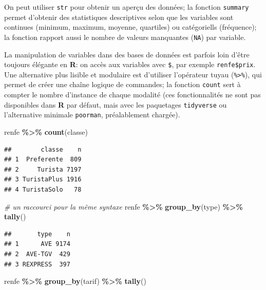 \documentclass[
  11pt,
  letterpaper,
]{book}
\newenvironment{Shaded}{\begin{snugshade}}{\end{snugshade}}
\newcommand{\CommentTok}[1]{\textcolor[rgb]{0.56,0.35,0.01}{\textit{#1}}}
\newcommand{\KeywordTok}[1]{\textcolor[rgb]{0.13,0.29,0.53}{\textbf{#1}}}
\newcommand{\NormalTok}[1]{#1}
\newcommand{\OperatorTok}[1]{\textcolor[rgb]{0.81,0.36,0.00}{\textbf{#1}}}
\newcommand{\StringTok}[1]{\textcolor[rgb]{0.31,0.60,0.02}{#1}}
\theoremstyle{definition}
\theoremstyle{definition}
\theoremstyle{definition}
\theoremstyle{remark}
\begin{document}
On peut utiliser \texttt{str} pour obtenir un aperçu des données; la fonction \texttt{summary} permet d'obtenir des statistiques descriptives selon que les variables sont continues (minimum, maximum, moyenne, quartiles) ou catégoriells (fréquence); la fonction rapport aussi le nombre de valeurs manquantes (\texttt{NA}) par variable.

La manipulation de variables dans des bases de données est parfois loin d'être toujours élégante en \textbf{R}: on accès aux variables avec \texttt{\$}, par exemple \texttt{renfe\$prix}. Une alternative plus lisible et modulaire est d'utiliser l'opérateur tuyau (\texttt{\%\textgreater{}\%}), qui permet de créer une chaîne logique de commandes; la fonction \texttt{count} sert à compter le nombre d'instance de chaque modalité (ces fonctionnalités ne sont pas disponibles dans \textbf{R} par défaut, mais avec les paquetages \texttt{tidyverse} ou l'alternative minimale \texttt{poorman}, préalablement chargée).

\begin{Shaded}
\begin{Highlighting}[]
\NormalTok{renfe }\OperatorTok{\%\textgreater{}\%}\StringTok{ }\KeywordTok{count}\NormalTok{(classe)}
\end{Highlighting}
\end{Shaded}

\begin{verbatim}
##        classe    n
## 1  Preferente  809
## 2     Turista 7197
## 3 TuristaPlus 1916
## 4 TuristaSolo   78
\end{verbatim}

\begin{Shaded}
\begin{Highlighting}[]
\CommentTok{\# un raccourci pour la même syntaxe}
\NormalTok{renfe }\OperatorTok{\%\textgreater{}\%}\StringTok{ }\KeywordTok{group\_by}\NormalTok{(type) }\OperatorTok{\%\textgreater{}\%}\StringTok{ }\KeywordTok{tally}\NormalTok{()}
\end{Highlighting}
\end{Shaded}

\begin{verbatim}
##       type    n
## 1      AVE 9174
## 2  AVE-TGV  429
## 3 REXPRESS  397
\end{verbatim}

\begin{Shaded}
\begin{Highlighting}[]
\NormalTok{renfe }\OperatorTok{\%\textgreater{}\%}\StringTok{ }\KeywordTok{group\_by}\NormalTok{(tarif) }\OperatorTok{\%\textgreater{}\%}\StringTok{ }\KeywordTok{tally}\NormalTok{()}
\end{Highlighting}
\end{Shaded}
\end{document}
